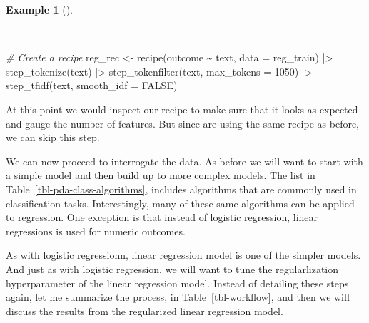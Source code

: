 \documentclass[
  letterpaper,
]{latex/krantz}
\newenvironment{Shaded}{\begin{snugshade}}{\end{snugshade}}
\newcommand{\AttributeTok}[1]{\textcolor[rgb]{0.00,0.00,0.00}{#1}}
\newcommand{\CommentTok}[1]{\textcolor[rgb]{0.00,0.00,0.00}{\textit{#1}}}
\newcommand{\ConstantTok}[1]{\textcolor[rgb]{0.00,0.00,0.00}{#1}}
\newcommand{\DecValTok}[1]{\textcolor[rgb]{0.00,0.00,0.00}{#1}}
\newcommand{\FunctionTok}[1]{\textcolor[rgb]{0.00,0.00,0.00}{#1}}
\newcommand{\NormalTok}[1]{\textcolor[rgb]{0.00,0.00,0.00}{#1}}
\newcommand{\OtherTok}[1]{\textcolor[rgb]{0.00,0.00,0.00}{#1}}
\newcommand{\SpecialCharTok}[1]{\textcolor[rgb]{0.00,0.00,0.00}{#1}}
\theoremstyle{definition}
\newtheorem{example}{Example}[chapter]
\theoremstyle{remark}
\begin{document}
\begin{example}[]\protect\hypertarget{exm-pda-reg-recipe}{}\label{exm-pda-reg-recipe}

~

\begin{Shaded}
\begin{Highlighting}[]
\CommentTok{\# Create a recipe}
\NormalTok{reg\_rec }\OtherTok{\textless{}{-}}
  \FunctionTok{recipe}\NormalTok{(outcome }\SpecialCharTok{\textasciitilde{}}\NormalTok{ text, }\AttributeTok{data =}\NormalTok{ reg\_train) }\SpecialCharTok{|\textgreater{}}
  \FunctionTok{step\_tokenize}\NormalTok{(text) }\SpecialCharTok{|\textgreater{}}
  \FunctionTok{step\_tokenfilter}\NormalTok{(text, }\AttributeTok{max\_tokens =} \DecValTok{1050}\NormalTok{) }\SpecialCharTok{|\textgreater{}}
  \FunctionTok{step\_tfidf}\NormalTok{(text, }\AttributeTok{smooth\_idf =} \ConstantTok{FALSE}\NormalTok{)}
\end{Highlighting}
\end{Shaded}

\end{example}

At this point we would inspect our recipe to make sure that it looks as
expected and gauge the number of features. But since are using the same
recipe as before, we can skip this step.

We can now proceed to interrogate the data. As before we will want to
start with a simple model and then build up to more complex models. The
list in Table~\ref{tbl-pda-class-algorithms}, includes algorithms that
are commonly used in classification tasks. Interestingly, many of these
same algorithms can be applied to regression. One exception is that
instead of logistic regression, linear regressions is used for numeric
outcomes.

As with logistic regressionn, linear regression model is one of the
simpler models. And just as with logistic regression, we will want to
tune the regularlization hyperparameter of the linear regression model.
Instead of detailing these steps again, let me summarize the process, in
Table~\ref{tbl-workflow}, and then we will discuss the results from the
regularized linear regression model.
\end{document}
